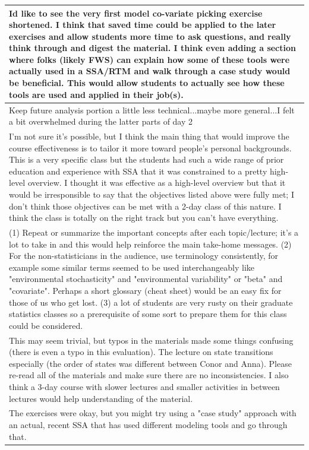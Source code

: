 \documentclass[]{article}
\begin{document}
\begin{table}[H]
\begin{tabular}{l}
Id like to see the very first model co-variate picking exercise shortened. I think that saved time could be applied to the later exercises and allow students more time to ask questions, and really think through and digest the material. I think even adding a section where folks (likely FWS) can explain how some of these tools were actually used in a SSA/RTM and walk through a case study would be beneficial. This would allow students to actually see how these tools are used and applied in their job(s).\\
\hline
Keep future analysis portion a little less technical...maybe more general...I felt a bit overwhelmed during the latter parts of day 2\\
\hline
I'm not sure it's possible, but I think the main thing that would improve the course effectiveness is to tailor it more toward people's personal backgrounds. This is a very specific class but the students had such a wide range of prior education and experience with SSA that it was constrained to a pretty high-level overview. I thought it was effective as a high-level overview but that it would be irresponsible to say that the objectives listed above were fully met; I don't think those objectives can be met with a 2-day class of this nature. I think the class is totally on the right track but you can't have everything.\\
\hline
(1) Repeat or summarize the important concepts after each topic/lecture; it's a lot to take in and this would help reinforce the main take-home messages. (2) For the non-statisticians in the audience, use terminology consistently, for example some similar terms seemed to be used interchangeably like "environmental stochasticity" and "environmental variability" or "beta" and "covariate".  Perhaps a short glossary (cheat sheet) would be an easy fix for those of us who get lost. (3) a lot of students are very rusty on their graduate statistics classes so a prerequisite of some sort to prepare them for this class could be considered.\\
\hline
This may seem trivial, but typos in the materials made some things confusing (there is even a typo in this evaluation). The lecture on state transitions especially (the order of states was different between Conor and Anna). Please re-read all of the materials and make sure there are no inconsistencies. I also think a 3-day course with slower lectures and smaller activities in between lectures would help understanding of the material.\\
\hline
The exercises were okay, but you might try using a "case study" approach with an actual, recent SSA that has used different modeling tools and go through that.\\

\end{tabular}
\end{table}
\end{document}

